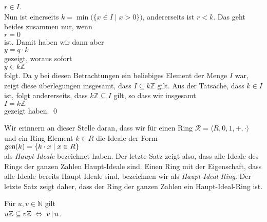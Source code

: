 \begin{enumerate}
      $r \in I$.
      \\[0.2cm]
      Nun ist einerseits $k = \min\bigl(\{x \in I \mid x > 0 \}\bigr)$, andererseits ist $r < k$.
      Das geht beides zusammen nur, wenn
      \\[0.2cm]
      \hspace*{1.3cm}
      $r = 0$
      \\[0.2cm]
      ist.  Damit haben wir dann aber
      \\[0.2cm]
      \hspace*{1.3cm}
      $y = q \cdot k$
      \\[0.2cm]
      gezeigt, woraus sofort
      \\[0.2cm]
      \hspace*{1.3cm}
      $y \in k\mathbb{Z}$
      \\[0.2cm]
      folgt.  Da $y$ bei diesen Betrachtungen ein beliebiges Element der Menge $I$ war,
      zeigt diese \"{u}berlegungen insgesamt, dass $I \subseteq k\mathbb{Z}$ gilt.  Aus der
      Tatsache, dass $k \in I$ ist, folgt andererseits, dass $k\mathbb{Z} \subseteq I$
      gilt, so dass wir insgesamt
      \\[0.2cm]
      \hspace*{1.3cm}
      $I = k\mathbb{Z}$
      \\[0.2cm]
      gezeigt haben.  \qed
\end{enumerate}

\remark
Wir erinnern an dieser Stelle daran, dass wir f\"{u}r einen Ring 
$\mathcal{R} = \langle R, 0, 1, +, \cdot \rangle$ und ein
Ring-Element $k \in R$ die Ideale der Form
\\[0.2cm]
\hspace*{1.3cm}
$\textsl{gen}(k) = \{ k \cdot x \mid x \in R \}$
\\[0.2cm]
als \emph{Haupt-Ideale} bezeichnet haben.  Der letzte Satz zeigt also, dass alle Ideale des Rings
der ganzen Zahlen Haupt-Ideale sind.  Einen Ring mit der Eigenschaft, dass alle Ideale
bereits Haupt-Ideale sind, bezeichnen wir als \emph{Haupt-Ideal-Ring}.  Der letzte Satz
zeigt daher, dass der Ring der ganzen Zahlen ein Haupt-Ideal-Ring ist.

\begin{Lemma}
  F\"{u}r $u,v \in \mathbb{N}$ gilt
  \\[0.2cm]
  \hspace*{1.3cm}
  $u\mathbb{Z} \subseteq v\mathbb{Z} \;\Leftrightarrow\; v \,|\, u$.
\end{Lemma}


